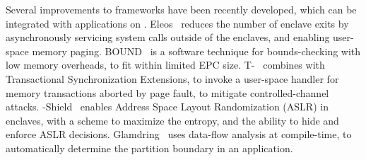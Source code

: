 

Several improvements to \sgx{} frameworks have been recently developed, 
which can
be integrated with applications on \graphenesgx{}.
Eleos~\cite{orenbach17eleos} reduces the number of enclave exits
by asynchronously servicing system calls outside of the enclaves, and enabling user-space memory paging.
\sgx{}BOUND~\cite{kuvaiskii17sgxbound} is a software technique for bounds-checking with low memory overheads,
to fit within limited EPC size.
T-\sgx{}~\cite{shih2017t-sgx} combines \sgx{} with Transactional Synchronization Extensions, to invoke a user-space handler for memory transactions aborted by page fault, to mitigate controlled-channel attacks.
\sgx{}-Shield~\cite{seo2017sgx-shield} enables Address Space Layout Randomization (ASLR) in enclaves, with a scheme to maximize the entropy, and the ability to hide and enforce ASLR decisions.
Glamdring~\cite{glamdring} uses data-flow analysis at compile-time, to automatically determine the partition boundary in an application.


